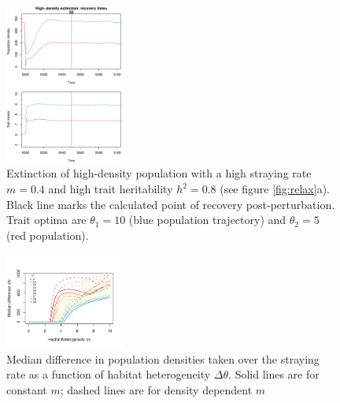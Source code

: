 \documentclass[twocolumn,preprintnumbers,amsmath,amssymb,superscriptaddress]{revtex4}
\begin{document}
\begin{figure}
  \captionsetup{justification=raggedright,
singlelinecheck=false
}
\centering
\includegraphics[width=0.35\textwidth]{figs2/fig_relax_large_highh.pdf}
\caption{
Extinction of high-density population with a high straying rate $m=0.4$ and high trait heritability $h^2=0.8$ (see figure \ref{fig:relax}a).
Black line marks the calculated point of recovery post-perturbation.
Trait optima are $\theta_1 = 10$ (blue population trajectory) and $\theta_2 = 5$ (red population).
} \label{fig:relaxtraj_hdhh}
\end{figure}



\begin{figure}
  \captionsetup{justification=raggedright,
singlelinecheck=false
}
\centering
\includegraphics[width=0.35\textwidth]{figs2/fig_thetadiffN.pdf}
\caption{
Median difference in population densities taken over the straying rate as a function of habitat heterogeneity $\Delta\theta$.
Solid lines are for constant $m$; dashed lines are for density dependent $m$} \label{fig:thetadiffN}
\end{figure}
\end{document}
